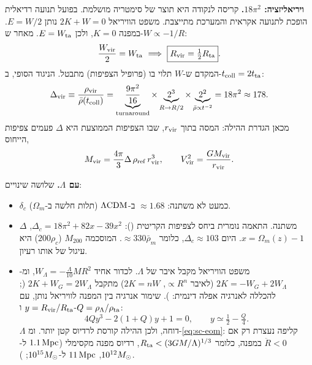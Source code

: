 \textbf{ויריאליזציה: $18\pi^2$.} קריסה לנקודה היא תוצר של סימטריה מושלמת. בפועל תנועה רדיאלית הופכת לתנועה אקראית והמערכת מתייצבת. משפט הוויריאל $2K+W=0$ נותן $E=W/2$. במפנה $K=0$, ולכן $E=W_{\rm ta}$. מאחר ש-$W\propto-1/R$:
\begin{equation}
\frac{W_{\rm vir}}{2}=W_{\rm ta}\ \Longrightarrow\ \boxed{R_{\rm vir}=\tfrac12R_{\rm ta}} .
\end{equation}
המקדם ש-$W$ תלוי בו (פרופיל הצפיפות) מתבטל. הניגוד הסופי, ב-$t_{\rm coll}=2t_{\rm ta}$:
\begin{equation}
\Delta_{\rm vir}\equiv\frac{\rho_{\rm vir}}{\bar\rho(t_{\rm coll})}
=\underbrace{\frac{9\pi^2}{16}}_{\rm turnaround}\times\underbrace{2^3}_{R\to R/2}\times\underbrace{2^2}_{\bar\rho\propto t^{-2}}=18\pi^2\approx178 .
\end{equation}
מכאן הגדרת ההילה: המסה בתוך $r_{\rm vir}$, שבו הצפיפות הממוצעת היא $\Delta$ פעמים צפיפות הייחוס,
\begin{equation}
M_{\rm vir}=\frac{4\pi}{3}\Delta\,\rho_{\rm ref}\,r_{\rm vir}^3,\qquad V_{\rm vir}^2=\frac{GM_{\rm vir}}{r_{\rm vir}} .
\label{eq:sc-rvir}
\end{equation}

\textbf{עם $\Lambda$.} שלושה שינויים:
\begin{itemize}
\item $\delta_c$ כמעט לא משתנה: $\approx1.68$ ב-$\Lambda\mathrm{CDM}$ (תלות חלשה ב-$\Omega_m$).
\item $\Delta$ משתנה. התאמה נומרית ביחס לצפיפות הקריטית (): $\Delta_c=18\pi^2+82x-39x^2$, $x=\Omega_m(z)-1$. היום $\Delta_c\approx103$, כלומר $\approx330\bar\rho_m$. המוסכמה $M_{200}$ ($200\rho_c$) היא עיגול של אותו רעיון.
\item משפט הוויריאל מקבל איבר של $\Lambda$. לכדור אחיד $W_\Lambda=-\frac{\Lambda}{10}MR^2$, ומ-$2K=-W_G+2W_\Lambda$ (לאיבר $\propto R^n$, $2K=nW$) מתקבל $2K+W_G=2W_\Lambda$ (; להכללה לאנרגיה אפלה דינמית: ). שימור אנרגיה בין המפנה לוויריאל נותן, עם $y=R_{\rm vir}/R_{\rm ta}$ ו-$Q=\rho_\Lambda/\rho_{\rm ta}$:
\begin{equation}
4Qy^3-2(1+Q)y+1=0,\qquad y\simeq\tfrac12-\tfrac{Q}{4}.
\end{equation}
$\Lambda$ דוחה, ולכן ההילה קורסת לרדיוס קטן יותר. ומ-\eqref{eq:sc-eom}: קליפה נעצרת רק אם $\ddot R<0$ במפנה, כלומר $R_{\rm ta}<(3GM/\Lambda)^{1/3}$, רדיוס מפנה מקסימלי ($1.1\,\mathrm{Mpc}$ ל-$10^{12}M_{\odot}$, $11\,\mathrm{Mpc}$ ל-$10^{15}M_{\odot}$; ).
\end{itemize}

